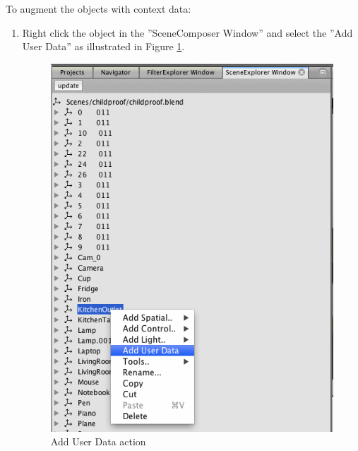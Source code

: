 To augment the objects with context data:
\begin{enumerate}
	\item Right click the object in the ''SceneComposer Window'' and select the ''Add User Data'' as illustrated in Figure \ref{fig:sd_add_user_data}.
		\begin{figure}[H]
			\centering
			\includegraphics[width=0.8\linewidth]{gfx/Chapter_SD_UserGuide/add_user_data}
			\caption{Add User Data action}
			\label{fig:sd_add_user_data}
		\end{figure}


\end{enumerate}
